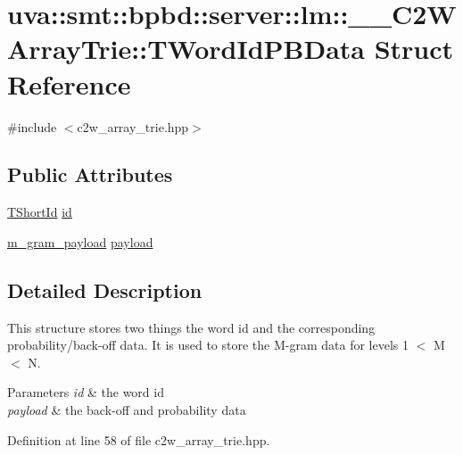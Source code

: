 \hypertarget{structuva_1_1smt_1_1bpbd_1_1server_1_1lm_1_1_____c2_w_array_trie_1_1_t_word_id_p_b_data}{}\section{uva\+:\+:smt\+:\+:bpbd\+:\+:server\+:\+:lm\+:\+:\+\_\+\+\_\+\+C2\+W\+Array\+Trie\+:\+:T\+Word\+Id\+P\+B\+Data Struct Reference}
\label{structuva_1_1smt_1_1bpbd_1_1server_1_1lm_1_1_____c2_w_array_trie_1_1_t_word_id_p_b_data}


{\ttfamily \#include $<$c2w\+\_\+array\+\_\+trie.\+hpp$>$}

\subsection*{Public Attributes}
\begin{DoxyCompactItemize}
\item 
\hyperlink{namespaceuva_1_1smt_1_1bpbd_1_1server_1_1lm_1_1identifiers_a33043a191e9a637dea742a89d23c8bdc}{T\+Short\+Id} \hyperlink{structuva_1_1smt_1_1bpbd_1_1server_1_1lm_1_1_____c2_w_array_trie_1_1_t_word_id_p_b_data_a6f8ebf8866fd2bb8e9a9b2c114b9f8e1}{id}
\item 
\hyperlink{namespaceuva_1_1smt_1_1bpbd_1_1server_1_1lm_1_1m__grams_a1422aa6b3f3cb9377916d20e9bf16c0a}{m\+\_\+gram\+\_\+payload} \hyperlink{structuva_1_1smt_1_1bpbd_1_1server_1_1lm_1_1_____c2_w_array_trie_1_1_t_word_id_p_b_data_a698578e589688c01e0b8c9c00e8bd114}{payload}
\end{DoxyCompactItemize}


\subsection{Detailed Description}
This structure stores two things the word id and the corresponding probability/back-\/off data. It is used to store the M-\/gram data for levels 1 $<$ M $<$ N. 
\begin{DoxyParams}{Parameters}
{\em id} & the word id \\
\hline
{\em payload} & the back-\/off and probability data \\
\hline
\end{DoxyParams}


Definition at line 58 of file c2w\+\_\+array\+\_\+trie.\+hpp.



